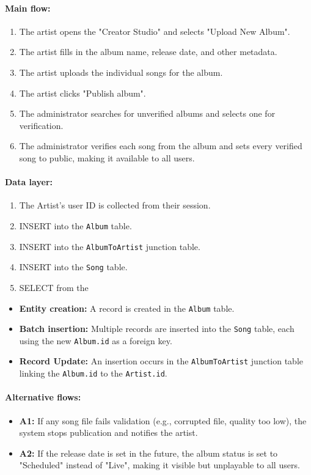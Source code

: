 \documentclass[11pt, a4paper]{article}
\begin{document}
\paragraph{Main flow:}
\begin{enumerate}
    \item The artist opens the "Creator Studio" and selects "Upload New Album".
    \item The artist fills in the album name, release date, and other metadata.
    \item The artist uploads the individual songs for the album.
    \item The artist clicks "Publish album".
    \item The administrator searches for unverified albums and selects one for verification.
    \item The administrator verifies each song from the album and sets every verified song to public, making it available to all users.
\end{enumerate}

\paragraph{Data layer:}
\begin{enumerate}
    \item The Artist's user ID is collected from their session.
    \item INSERT into the \texttt{Album} table.
    \item INSERT into the \texttt{AlbumToArtist} junction table.
    \item INSERT into the \texttt{Song} table.
    \item SELECT from the
\end{enumerate}

\begin{itemize}
    \item \textbf{Entity creation:} A record is created in the \texttt{Album} table.
    \item \textbf{Batch insertion:} Multiple records are inserted into the \texttt{Song} table, each using the new \texttt{Album.id} as a foreign key.
    \item \textbf{Record Update:} An insertion occurs in the \texttt{AlbumToArtist} junction table linking the \texttt{Album.id} to the \texttt{Artist.id}.
\end{itemize}

\paragraph{Alternative flows:}
\begin{itemize}
    \item \textbf{A1:} If any song file fails validation (e.g., corrupted file, quality too low), the system stops publication and notifies the artist.
    \item \textbf{A2:} If the release date is set in the future, the album status is set to "Scheduled" instead of "Live", making it visible but unplayable to all users.
\end{itemize}
\end{document}
